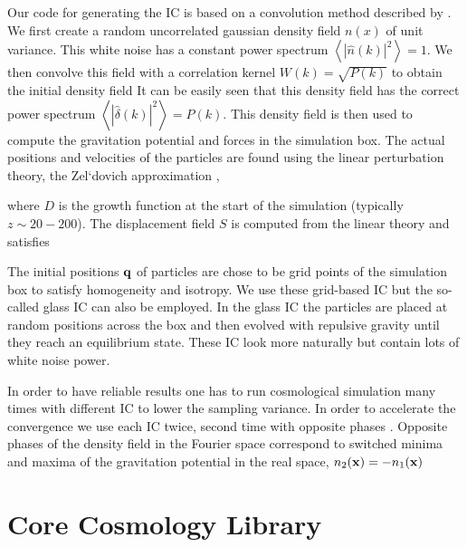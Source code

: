 Our code for generating the IC is based on a convolution method described by \textcite{1997ApJ...490L.127P}. We first create a random uncorrelated gaussian density field $n(x)$ of unit variance. This white noise has a constant power spectrum $\left\langle|\hat n(k)|^2\right\rangle=1$. We then convolve this field with a correlation kernel $W(k)=\sqrt{P(k)}$ to obtain the initial  density field
It can be easily seen that this density field has the correct power spectrum $\left\langle|\hat\delta(k)|^2\right\rangle=P(k)$. This density field is then used to compute the gravitation potential and forces in the simulation box. The actual positions and velocities of the particles are found using the linear perturbation theory, the Zel`dovich approximation \parencite{1970A&A.....5...84Z},
\begin{sloppypar}
where $D$ is the growth function at the start of the simulation (typically ${z\sim20-200}$). The displacement field $S$ is computed from the linear theory and satisfies
\end{sloppypar}
The initial positions $\mathbf q$ of particles are chose to be grid points of the simulation box to satisfy homogeneity and isotropy. We use these grid-based IC but the so-called glass IC can also be employed. In the glass IC the particles are placed at random positions across the box and then evolved with repulsive gravity until they reach an equilibrium state. These IC look more naturally but contain lots of white noise power.

In order to have reliable results one has to run cosmological simulation many times with different IC to lower the sampling variance. In order to accelerate the convergence we use each IC twice, second time with opposite phases \parencite{PhysRevD.93.103519}. Opposite phases of the density field in the Fourier space correspond to switched minima and maxima of the gravitation potential in the real space, $n_2(\mathbf x)=-n_1(\mathbf x)$

\section{Core Cosmology Library}

